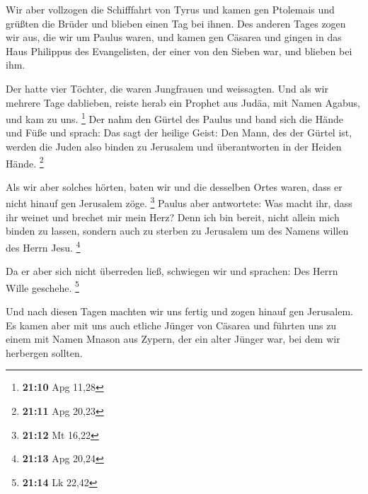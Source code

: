  Wir aber vollzogen die Schifffahrt von Tyrus und kamen
gen Ptolemais und grüßten die Brüder und blieben einen Tag bei ihnen.
 Des anderen Tages zogen wir aus, die wir um Paulus waren,
und kamen gen Cäsarea und gingen in das Haus Philippus des Evangelisten,
der einer von den Sieben war, und blieben bei ihm.

 Der hatte vier Töchter, die waren Jungfrauen und
weissagten.  Und als wir mehrere Tage dablieben, reiste
herab ein Prophet aus Judäa, mit Namen Agabus, und kam zu uns.
\footnote{\textbf{21:10} Apg 11,28}  Der nahm den Gürtel
des Paulus und band sich die Hände und Füße und sprach: Das sagt der
heilige Geist: Den Mann, des der Gürtel ist, werden die Juden also
binden zu Jerusalem und überantworten in der Heiden Hände. \footnote{\textbf{21:11}
  Apg 20,23}

 Als wir aber solches hörten, baten wir und die desselben
Ortes waren, dass er nicht hinauf gen Jerusalem zöge. \footnote{\textbf{21:12}
  Mt 16,22}  Paulus aber antwortete: Was macht ihr, dass
ihr weinet und brechet mir mein Herz? Denn ich bin bereit, nicht allein
mich binden zu lassen, sondern auch zu sterben zu Jerusalem um des
Namens willen des Herrn Jesu. \footnote{\textbf{21:13} Apg 20,24}

 Da er aber sich nicht überreden ließ, schwiegen wir und
sprachen: Des Herrn Wille geschehe. \footnote{\textbf{21:14} Lk 22,42}

 Und nach diesen Tagen machten wir uns fertig und zogen
hinauf gen Jerusalem.  Es kamen aber mit uns auch etliche
Jünger von Cäsarea und führten uns zu einem mit Namen Mnason aus Zypern,
der ein alter Jünger war, bei dem wir herbergen sollten.

